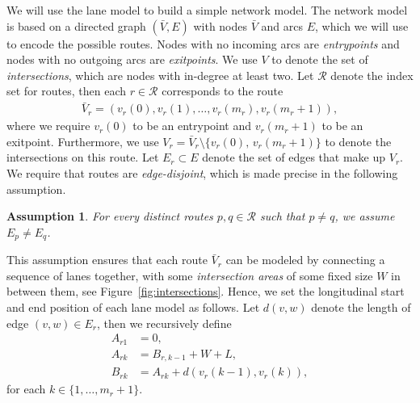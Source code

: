 \documentclass[a4paper]{report}
\theoremstyle{definition}
\theoremstyle{plain}
\newtheorem{assump}{Assumption}[chapter]
\begin{document}
We will use the lane model to build a simple network model. The network model is
based on a directed graph $(\bar{V},E)$ with nodes $\bar{V}$ and arcs $E$, which
we will use to encode the possible routes.
%
Nodes with no incoming arcs are \textit{entrypoints} and nodes with no outgoing
arcs are \textit{exitpoints}.
%
We use $V$ to denote the set of \textit{intersections}, which are nodes with
in-degree at least two.
%
Let $\mathcal{R}$ denote the index set for routes, then each $r \in \mathcal{R}$
corresponds to the route
\begin{align*}
  \bar{V}_{r} = (v_{r}(0), v_{r}(1), \dots, v_{r}(m_{r}), v_{r}(m_{r}+1)) ,
\end{align*}
%
where we require $v_{r}(0)$ to be an entrypoint and $v_{r}(m_{r}+1)$ to be an
exitpoint. Furthermore, we use
$V_{r} = \bar{V}_{r} \setminus \{ v_{r}(0), \, v_{r}(m_{r}+1) \}$ to denote the
intersections on this route.
%
Let $E_{r} \subset E$ denote the set of edges that make up $V_{r}$.
%
We require that routes are \emph{edge-disjoint}, which is made precise in the
following assumption.

\begin{assump}\label{assump:disjoint-routes}
  For every distinct routes $p,q \in \mathcal{R}$ such that $p \neq q$, we
  assume $E_{p} \neq E_{q}$.
\end{assump}

This assumption ensures that each route $\bar{V}_{r}$ can be modeled by
connecting a sequence of lanes together, with some \emph{intersection areas} of
some fixed size $W$ in between them, see Figure~\ref{fig:intersections}.
%
Hence, we set the longitudinal start and end position of each lane model as
follows. Let $d(v, w)$ denote the length of edge $(v,w) \in E_{r}$, then we
recursively define
\begin{subequations}
\begin{align}
  A_{r1} &= 0 , \\
  A_{rk} &= B_{r,k-1} + W + L , \\
  B_{rk} &= A_{rk} + d(v_{r}(k-1), v_{r}(k)) ,
\end{align}
\end{subequations}
for each $k \in \{1, \dots, m_{r} + 1\}$.
\end{document}
